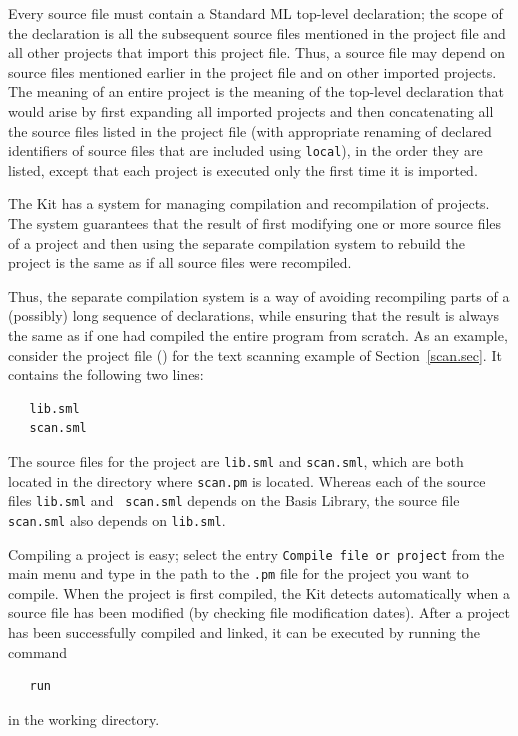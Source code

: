 \documentclass[12pt]{book}
\begin{document}
Every source file must contain a Standard ML top-level declaration;
the scope of the declaration is all the subsequent source files
mentioned in the project file and all other projects that import this
project file. Thus, a source file may depend on source files mentioned
earlier in the project file and on other imported projects.  The
meaning of an entire project is the meaning of the top-level
declaration that would arise by first expanding all imported projects
and then concatenating all the source files listed in the project file
(with appropriate renaming of declared identifiers of source files that are
included using {\tt local}), in the order they are listed, except that
each project is executed only the first time it is imported.

The Kit has a system for managing compilation and recompilation of
%
projects.  The system guarantees that the result of first modifying
one or more source files of a project and then using the separate
compilation system to rebuild the project is the same as if all 
%
source files were
%
recompiled.

Thus, the separate compilation system is a way of avoiding recompiling
parts of a (possibly) long sequence of declarations, while ensuring
that the result is always the same as if one had compiled the entire
program from scratch.  As an example, consider the project file
() for the text scanning example of
Section~\ref{scan.sec}. It contains the following two lines:
\begin{verbatim}
   lib.sml
   scan.sml
\end{verbatim}

\noindent 
The source files for the project are {\tt lib.sml} and {\tt scan.sml},
which are both located in the directory where {\tt scan.pm} is
located. Whereas each of the source files {\tt lib.sml} and {\tt
  scan.sml} depends on the Basis Library, the source file {\tt
  scan.sml} also depends on {\tt lib.sml}.


Compiling a project is easy; select the entry {\tt Compile file
  or project} from the main menu and type in the path to the {\tt .pm}
file for the project you want to compile. When the project is first
compiled, the Kit detects automatically when a source file has been
modified (by checking file modification dates). After a project has
been successfully compiled and linked, it can be executed by running
the command
%
\begin{verbatim}
   run
\end{verbatim}
in the working directory.  
\end{document}
